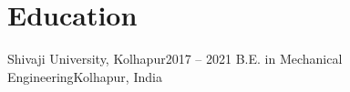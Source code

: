 \section{Education}
\resumeSubHeadingListStart
    \resumeSubheading
    {Shivaji University, Kolhapur}{2017 -- 2021}
    {B.E. in Mechanical Engineering}{Kolhapur, India}
\resumeSubHeadingListEnd
